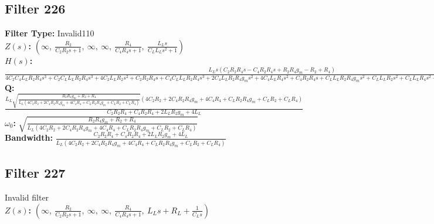 \documentclass{article}
\begin{document}
\subsection*{Filter 226}
\textbf{Filter Type:} Invalid110 \\ 
\textbf{$Z(s)$:} $\left( \infty, \  \frac{R_{2}}{C_{2} R_{2} s + 1}, \  \infty, \  \infty, \  \frac{R_{4}}{C_{4} R_{4} s + 1}, \  \frac{L_{L} s}{C_{L} L_{L} s^{2} + 1}\right)$ \\ 
\textbf{$H(s)$:} $\frac{L_{L} s \left(C_{2} R_{2} R_{4} s - C_{4} R_{2} R_{4} s + R_{2} R_{4} g_{m} - R_{2} + R_{4}\right)}{4 C_{2} C_{4} L_{L} R_{2} R_{4} s^{3} + C_{2} C_{L} L_{L} R_{2} R_{4} s^{3} + 4 C_{2} L_{L} R_{2} s^{2} + C_{2} R_{2} R_{4} s + C_{4} C_{L} L_{L} R_{2} R_{4} s^{3} + 2 C_{4} L_{L} R_{2} R_{4} g_{m} s^{2} + 4 C_{4} L_{L} R_{4} s^{2} + C_{4} R_{2} R_{4} s + C_{L} L_{L} R_{2} R_{4} g_{m} s^{2} + C_{L} L_{L} R_{2} s^{2} + C_{L} L_{L} R_{4} s^{2} + 2 L_{L} R_{2} g_{m} s + 4 L_{L} s + R_{2} R_{4} g_{m} + R_{2} + R_{4}}$ \\ 
\textbf{Q:} $\frac{L_{L} \sqrt{\frac{R_{2} R_{4} g_{m} + R_{2} + R_{4}}{L_{L} \left(4 C_{2} R_{2} + 2 C_{4} R_{2} R_{4} g_{m} + 4 C_{4} R_{4} + C_{L} R_{2} R_{4} g_{m} + C_{L} R_{2} + C_{L} R_{4}\right)}} \left(4 C_{2} R_{2} + 2 C_{4} R_{2} R_{4} g_{m} + 4 C_{4} R_{4} + C_{L} R_{2} R_{4} g_{m} + C_{L} R_{2} + C_{L} R_{4}\right)}{C_{2} R_{2} R_{4} + C_{4} R_{2} R_{4} + 2 L_{L} R_{2} g_{m} + 4 L_{L}}$ \\ 
\textbf{$\omega_0$:} $\sqrt{\frac{R_{2} R_{4} g_{m} + R_{2} + R_{4}}{L_{L} \left(4 C_{2} R_{2} + 2 C_{4} R_{2} R_{4} g_{m} + 4 C_{4} R_{4} + C_{L} R_{2} R_{4} g_{m} + C_{L} R_{2} + C_{L} R_{4}\right)}}$ \\ 
\textbf{Bandwidth:} $\frac{C_{2} R_{2} R_{4} + C_{4} R_{2} R_{4} + 2 L_{L} R_{2} g_{m} + 4 L_{L}}{L_{L} \left(4 C_{2} R_{2} + 2 C_{4} R_{2} R_{4} g_{m} + 4 C_{4} R_{4} + C_{L} R_{2} R_{4} g_{m} + C_{L} R_{2} + C_{L} R_{4}\right)}$ \\ 
\subsection*{Filter 227}
Invalid filter \\ 
\textbf{$Z(s)$:} $\left( \infty, \  \frac{R_{2}}{C_{2} R_{2} s + 1}, \  \infty, \  \infty, \  \frac{R_{4}}{C_{4} R_{4} s + 1}, \  L_{L} s + R_{L} + \frac{1}{C_{L} s}\right)$ \\ 
\end{document}

